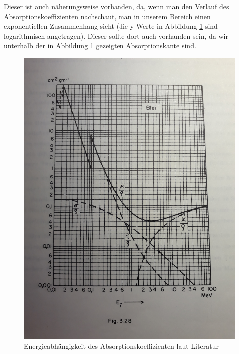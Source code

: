 Dieser ist auch näherungsweise vorhanden, da, wenn man den Verlauf des Absorptionskoeffizienten nachschaut, man in unserem Bereich einen 
exponentiellen Zusammenhang sieht (die y-Werte in Abbildung \ref{AbsLit} sind logarithmisch angetragen). Dieser sollte dort auch vorhanden sein, da 
wir unterhalb der in Abbildung \ref{AbsLit} gezeigten Absorptionskante sind.


\begin{figure}
    \captionsetup{justification=centering,margin=2cm}
    \centering
    \includegraphics[width = 12cm, angle = -90]{Bilder/Auswertung/AbsMamier.jpg}
    \caption{Energieabhängigkeit des Absorptionskoeffizienten laut Literatur \cite[S.46a]{Marmier1977}}
    \label{AbsLit}
    
\end{figure}
